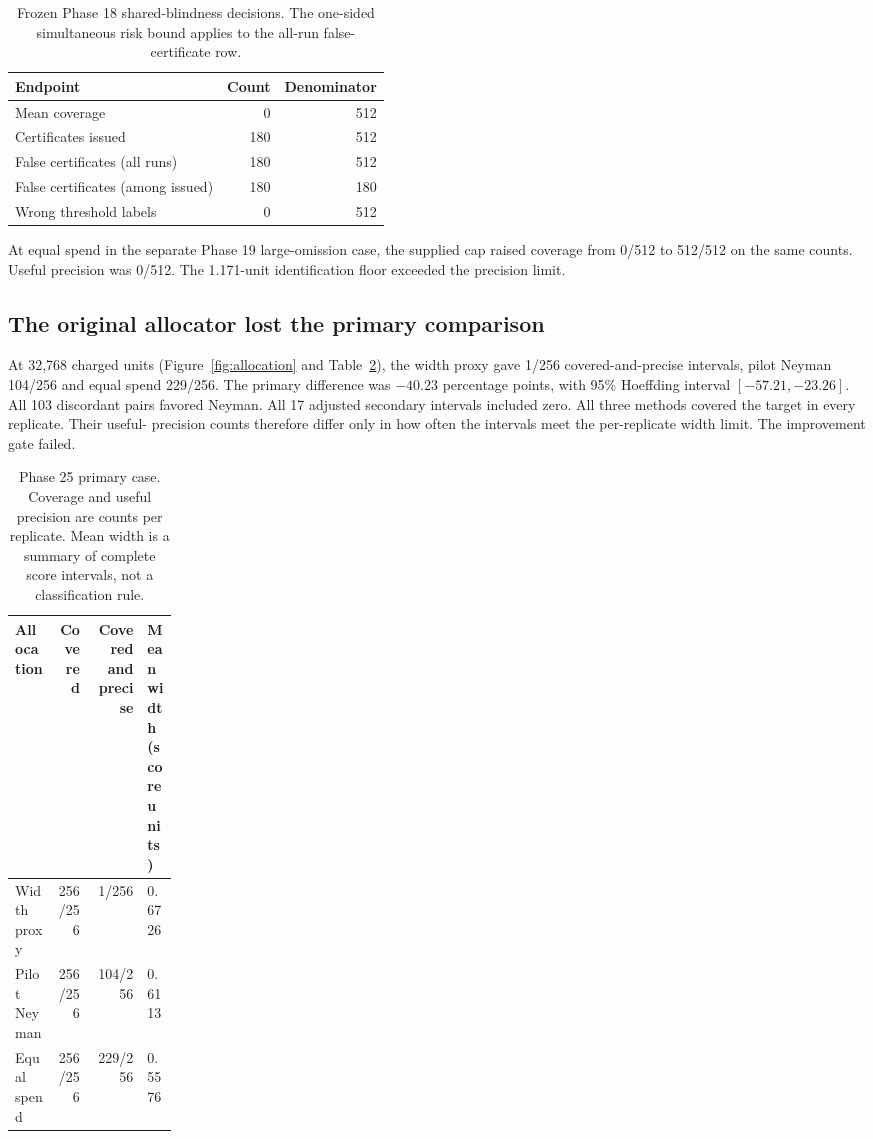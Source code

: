 \documentclass[article,nojss]{jss}
\begin{document}
\begin{table}[htbp]
\centering
\small
\begin{tabular}{lrr}
\hline
Endpoint & Count & Denominator \\
\hline
Mean coverage & 0 & 512 \\
Certificates issued & 180 & 512 \\
False certificates (all runs) & 180 & 512 \\
False certificates (among issued) & 180 & 180 \\
Wrong threshold labels & 0 & 512 \\
\hline
\end{tabular}
\caption{Frozen Phase 18 shared-blindness decisions. The one-sided simultaneous risk bound applies to the all-run false-certificate row.}
\label{tab:shared}
\end{table}

At equal spend in the separate Phase 19 large-omission case, the
supplied cap raised coverage from 0/512 to 512/512 on the same counts.
Useful precision was 0/512. The 1.171-unit identification floor exceeded
the precision limit.

\subsection{The original allocator lost the primary comparison}

At 32,768 charged units (Figure~\ref{fig:allocation} and
Table~\ref{tab:allocation}), the width proxy gave 1/256 covered-and-precise
intervals, pilot Neyman 104/256 and equal spend 229/256. The primary
difference was \(-40.23\) percentage points, with 95\% Hoeffding
interval \([-57.21,-23.26]\). All 103 discordant pairs favored Neyman. All 17 adjusted
secondary intervals included zero. All three methods covered the target in every replicate. Their useful-
precision counts therefore differ only in how often the intervals meet
the per-replicate width limit.
The improvement gate failed.

\begin{table}[htbp]
\centering
\small
\begin{tabular}{lrrp{0.19\linewidth}}
\hline
Allocation & Covered & Covered and precise & Mean width (score units) \\
\hline
Width proxy & 256/256 & 1/256 & 0.6726 \\
Pilot Neyman & 256/256 & 104/256 & 0.6113 \\
Equal spend & 256/256 & 229/256 & 0.5576 \\
\hline
\end{tabular}
\caption{Phase 25 primary case. Coverage and useful precision are counts per replicate. Mean width is a summary of complete score intervals, not a classification rule.}
\label{tab:allocation}
\end{table}
\end{document}
